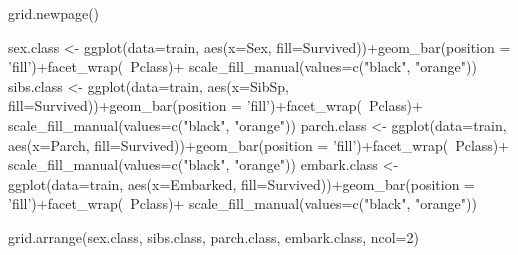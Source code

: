 \documentclass[
]{article}
\newenvironment{Shaded}{\begin{snugshade}}{\end{snugshade}}
\newcommand{\DataTypeTok}[1]{\textcolor[rgb]{0.87,0.87,0.75}{#1}}
\newcommand{\DecValTok}[1]{\textcolor[rgb]{0.86,0.86,0.80}{#1}}
\newcommand{\KeywordTok}[1]{\textcolor[rgb]{0.94,0.87,0.69}{#1}}
\newcommand{\NormalTok}[1]{\textcolor[rgb]{0.80,0.80,0.80}{#1}}
\newcommand{\OperatorTok}[1]{\textcolor[rgb]{0.94,0.94,0.82}{#1}}
\newcommand{\StringTok}[1]{\textcolor[rgb]{0.80,0.58,0.58}{#1}}
\begin{document}
\begin{Shaded}
\begin{Highlighting}[]
\KeywordTok{grid.newpage}\NormalTok{()}

\NormalTok{sex.class <-}\StringTok{ }\KeywordTok{ggplot}\NormalTok{(}\DataTypeTok{data=}\NormalTok{train, }\KeywordTok{aes}\NormalTok{(}\DataTypeTok{x=}\NormalTok{Sex, }\DataTypeTok{fill=}\NormalTok{Survived))}\OperatorTok{+}\KeywordTok{geom_bar}\NormalTok{(}\DataTypeTok{position =} \StringTok{'fill'}\NormalTok{)}\OperatorTok{+}\KeywordTok{facet_wrap}\NormalTok{(}\OperatorTok{~}\NormalTok{Pclass)}\OperatorTok{+}\StringTok{ }\KeywordTok{scale_fill_manual}\NormalTok{(}\DataTypeTok{values=}\KeywordTok{c}\NormalTok{(}\StringTok{"black"}\NormalTok{, }\StringTok{"orange"}\NormalTok{))}
\NormalTok{sibs.class <-}\StringTok{ }\KeywordTok{ggplot}\NormalTok{(}\DataTypeTok{data=}\NormalTok{train, }\KeywordTok{aes}\NormalTok{(}\DataTypeTok{x=}\NormalTok{SibSp, }\DataTypeTok{fill=}\NormalTok{Survived))}\OperatorTok{+}\KeywordTok{geom_bar}\NormalTok{(}\DataTypeTok{position =} \StringTok{'fill'}\NormalTok{)}\OperatorTok{+}\KeywordTok{facet_wrap}\NormalTok{(}\OperatorTok{~}\NormalTok{Pclass)}\OperatorTok{+}\StringTok{ }\KeywordTok{scale_fill_manual}\NormalTok{(}\DataTypeTok{values=}\KeywordTok{c}\NormalTok{(}\StringTok{"black"}\NormalTok{, }\StringTok{"orange"}\NormalTok{))}
\NormalTok{parch.class <-}\StringTok{ }\KeywordTok{ggplot}\NormalTok{(}\DataTypeTok{data=}\NormalTok{train, }\KeywordTok{aes}\NormalTok{(}\DataTypeTok{x=}\NormalTok{Parch, }\DataTypeTok{fill=}\NormalTok{Survived))}\OperatorTok{+}\KeywordTok{geom_bar}\NormalTok{(}\DataTypeTok{position =} \StringTok{'fill'}\NormalTok{)}\OperatorTok{+}\KeywordTok{facet_wrap}\NormalTok{(}\OperatorTok{~}\NormalTok{Pclass)}\OperatorTok{+}\StringTok{ }\KeywordTok{scale_fill_manual}\NormalTok{(}\DataTypeTok{values=}\KeywordTok{c}\NormalTok{(}\StringTok{"black"}\NormalTok{, }\StringTok{"orange"}\NormalTok{))}
\NormalTok{embark.class <-}\StringTok{ }\KeywordTok{ggplot}\NormalTok{(}\DataTypeTok{data=}\NormalTok{train, }\KeywordTok{aes}\NormalTok{(}\DataTypeTok{x=}\NormalTok{Embarked, }\DataTypeTok{fill=}\NormalTok{Survived))}\OperatorTok{+}\KeywordTok{geom_bar}\NormalTok{(}\DataTypeTok{position =} \StringTok{'fill'}\NormalTok{)}\OperatorTok{+}\KeywordTok{facet_wrap}\NormalTok{(}\OperatorTok{~}\NormalTok{Pclass)}\OperatorTok{+}\StringTok{ }\KeywordTok{scale_fill_manual}\NormalTok{(}\DataTypeTok{values=}\KeywordTok{c}\NormalTok{(}\StringTok{"black"}\NormalTok{, }\StringTok{"orange"}\NormalTok{))}

\KeywordTok{grid.arrange}\NormalTok{(sex.class, sibs.class, parch.class, embark.class,  }\DataTypeTok{ncol=}\DecValTok{2}\NormalTok{)}
\end{Highlighting}
\end{Shaded}
\end{document}
